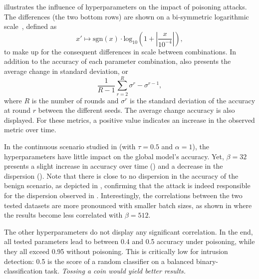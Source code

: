  illustrates the influence of hyperparameters on the impact of poisoning attacks.
The differences (the two bottom rows) are shown on a bi-symmetric logarithmic scale~\cite{webber_bisymmetriclogtransformation_2012}, defined as 
\begin{equation}
  x' \mapsto \text{sgn}(x) \cdot \text{log}_\text{10}(1+|\frac{x}{10^{-4}}|),
\end{equation}
to make up for the consequent differences in scale between combinations.
In addition to the accuracy of each parameter combination,  also presents the average change in standard deviation, or 
\begin{equation}
    \frac{1}{R-1}\sum_{r=2}^{R} \sigma^r - \sigma^{r-1},
\end{equation}
where $R$ is the number of rounds and $\sigma^r$ is the standard deviation of the accuracy at round $r$ between the different seeds.
The average change accuracy is also displayed.
For these metrics, a positive value indicates an increase in the observed metric over time.

In the continuous scenario studied in  (with $\tau=0.5$ and $\alpha=1$), the hyperparameters have little impact on the global model's accuracy.
Yet, $\beta=32$ presents a slight increase in accuracy over time () and a decrease in the dispersion ().
Note that there is close to no dispersion in the accuracy of the benign scenario, as depicted in , confirming that the attack is indeed responsible for the dispersion observed in .
Interestingly, the correlations between the two tested datasets are more pronounced with smaller batch sizes, as shown in  where the results become less correlated with $\beta=512$.

The other hyperparameters do not display any significant correlation.
In the end, all tested parameters lead to between 0.4 and 0.5 accuracy under poisoning, while they all exceed 0.95 without poisoning.
This is critically low for intrusion detection: 0.5 is the score of a random classifier on a balanced binary-classification task.
\emph{Tossing a coin would yield better results.}


